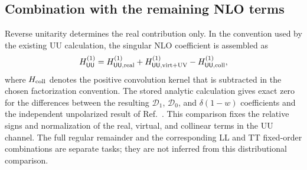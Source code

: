 \subsection{Combination with the remaining NLO terms}

Reverse unitarity determines the real contribution only.  In the convention
used by the existing UU calculation, the singular NLO coefficient is assembled
as
\begin{equation}
 H_{\mathsf{UU}}^{(1)}
 =H_{\mathsf{UU},\rm real}^{(1)}
 +H_{\mathsf{UU},\rm virt+UV}^{(1)}
 -H_{\mathsf{UU},\rm coll}^{(1)},
 \label{eq:nlo-uu-assembly}
\end{equation}
where $H_{\rm coll}$ denotes the positive convolution kernel that is
subtracted in the chosen factorization convention.  The stored analytic
calculation gives exact zero for the differences between the resulting
$\mathcal D_1$, $\mathcal D_0$, and $\delta(1-w)$ coefficients and the
independent unpolarized result of Ref.~\cite{Aversa:1988vb}.  This comparison
fixes the relative signs and normalization of the real, virtual, and collinear
terms in the UU channel.  The full regular remainder and the corresponding
LL and TT fixed-order combinations are separate tasks; they are not inferred
from this distributional comparison.
